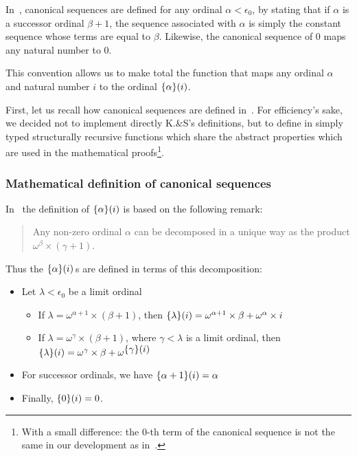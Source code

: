 \begin{remark}
  In~\cite{KS81}, canonical sequences are defined for any ordinal $\alpha <\epsilon_0$,
by stating that if $\alpha$ is a successor ordinal $\beta+1$,  the sequence associated with 
$\alpha$ is simply the constant sequence whose terms are equal to $\beta$.
Likewise, the canonical sequence of $0$ maps any natural number to $0$.

This convention allows us to make total the function that maps any ordinal $\alpha$ and natural number $i$ to the ordinal $\mbox{$\{\alpha\}(i)$}$.

\end{remark}


First, let us recall how canonical sequences are defined in~\cite{KS81}. For efficiency's sake, we decided not to implement directly K.\&S's definitions, but to define in \gallina{} simply typed structurally recursive functions which share the abstract properties which are used in the mathematical proofs\footnote{With a small difference: the $0$-th term of the canonical sequence is not the same in our development as in~\cite{KS81}.}.





\subsubsection{Mathematical definition of canonical sequences} 

In~\cite{KS81} the definition of $\mbox{$\{\alpha\}(i)$}$ is based on the following remark:
\begin{quote}
Any non-zero ordinal $\alpha$ can be decomposed in a unique way as the product
$\omega^\beta\times (\gamma+1)$.
\end{quote}

Thus the $\mbox{$\{\alpha\}(i)$}$\,s are defined in terms of this decomposition:
\begin{definition}
\label{def:canonseq-math}
  
\end{definition}
\begin{mathframe}
  \begin{itemize}
\item Let $\lambda<\epsilon_0$ be a limit ordinal 

\begin{itemize}
\item If $\lambda=\omega^{\alpha+1}\times (\beta+1)$, then 
$\mbox{$\{\lambda\}(i)$}= \omega^{\alpha+1}\times\beta +  \omega^\alpha \times i$
\item If $\lambda=\omega^{\gamma}\times (\beta+1)$, where $\gamma<\lambda$ is a limit ordinal, then 
$\mbox{$\{\lambda\}(i)$}=\omega^{\gamma}\times \beta + \omega^{\mbox{$\{\gamma\}(i)$}}$
\end{itemize}

\item For successor ordinals, we have $\mbox{$\{\alpha+1\}(i)$}= \alpha$ 

\item Finally, $\mbox{$\{0\}(i)$}= 0$.
\end{itemize}
\end{mathframe}


